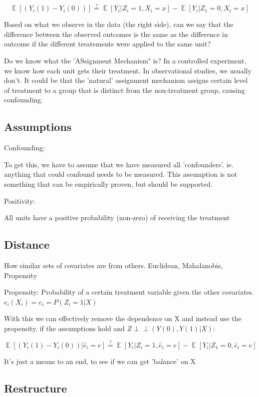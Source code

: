 \documentclass{article}
\DeclareMathOperator{\EX}{\mathbb{E}} %
\newcommand{\indep}{\perp\!\!\!\!\perp} %
\begin{document}
$$
\EX[(Y_i(1) - Y_i(0))] \overset{?}{=} \EX[Y_i|Z_i=1, X_i = x] - \EX[Y_i|Z_1=0, X_i = x]
$$

Based on what we observe in the data (the right side), can we say that the difference between the observed outcomes is the same as the difference in outcome if the different treatements were applied to the same unit?

Do we know what the 'ASsignment Mechanism" is? In a controlled experiment, we know how each unit gets their treatment. In observational studies, we usually don't. It could be that the 'natural' assignment mechanism assigns certain level of treatment to a group that is distinct from the non-treatment group, causing confounding.

\subsection{Assumptions}

Confounding: 

To get this, we have to assume that we have measured all 'confounders'. ie. anything that could confound needs to be measured. This assumption is not something that can be empirically proven, but should be supported.

Positivity: 

All units have a positive probability (non-zero) of receiving the treatment

\subsection{Distance}

How similar sets of covariates are from others. Euclidean, Mahalanobis, Propensity

Propensity: Probability of a certain treatment variable given the other covariates. $e_i(X_i) = e_i = P(Z_i = 1|X)$

With this we can effectively remove the dependence on X and instead use the propensity, if the assumptions hold and $Z \indep (Y(0), Y(1)|X)$:

$$
\EX[(Y_i(1) - Y_i(0))|\hat{e}_i = e] \overset{?}{=} \EX[Y_i|Z_i=1, \hat{e}_i = e] - \EX[Y_i|Z_1=0, \hat{e}_i = e]
$$

It's just a means to an end, to see if we can get 'balance' on X

\subsection{Restructure}
\end{document}
